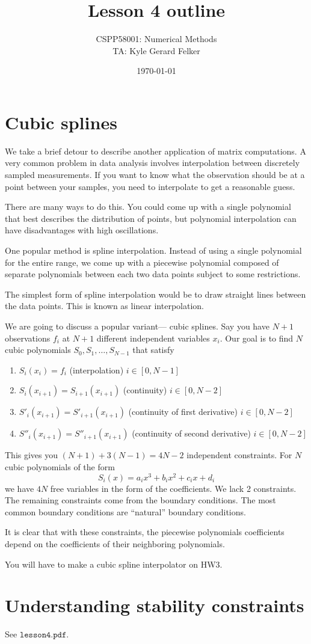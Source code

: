 \documentclass[11pt]{article}
\begin{document}
\title{Lesson 4 outline} 
\author{CSPP58001: Numerical Methods \\ TA: Kyle Gerard Felker}
\date{\today}
\maketitle

\section{Cubic splines}
We take a brief detour to describe another application of matrix computations. A very common problem in data analysis involves interpolation between discretely sampled measurements. If you want to know what the observation should be at a point between your samples, you need to interpolate to get a reasonable guess.

There are many ways to do this. You could come up with a single polynomial that best describes the distribution of points, but polynomial interpolation can have disadvantages with high oscillations. 

One popular method is spline interpolation. Instead of using a single polynomial for the entire range, we come up with a piecewise polynomial composed of separate polynomials between each two data points subject to some restrictions.

The simplest form of spline interpolation would be to draw straight lines between the data points. This is known as linear interpolation. 

We are going to discuss a popular variant--- cubic splines. Say you have $N+1$ observations $f_i$ at $N+1$ different independent variables $x_i$. Our goal is to find $N$ cubic polynomials $S_0,S_1,\ldots,S_{N-1}$ that satisfy

\begin{enumerate}

\item $S_i(x_i) = f_i$ (interpolation) $i \in [0,N-1]$
\item $S_i(x_{i+1}) = S_{i+1}(x_{i+1})$ (continuity) $i \in [0,N-2]$
\item  $S'_i(x_{i+1}) = S'_{i+1}(x_{i+1})$ (continuity of first derivative) $i \in [0,N-2]$
\item  $S''_i(x_{i+1}) = S''_{i+1}(x_{i+1})$ (continuity of second derivative) $i \in [0,N-2]$

\end{enumerate}
This gives you $(N+1) + 3(N-1) = 4N -2$ independent constraints. For $N$ cubic polynomials of the form 
$$ S_i(x) = a_ix^3 + b_ix^2 +c_ix +d_i $$
we have $4N$ free variables in the form of the coefficients. We lack 2 constraints. The remaining constraints come from the boundary conditions. The most common boundary conditions are ``natural'' boundary conditions.
 
It is clear that with these constraints, the piecewise polynomials coefficients depend on the coefficients of their neighboring polynomials. 

You will have to make a cubic spline interpolator on HW3. 

\section{Understanding stability constraints}
See $\texttt{lesson4.pdf}$.
\end{document}

